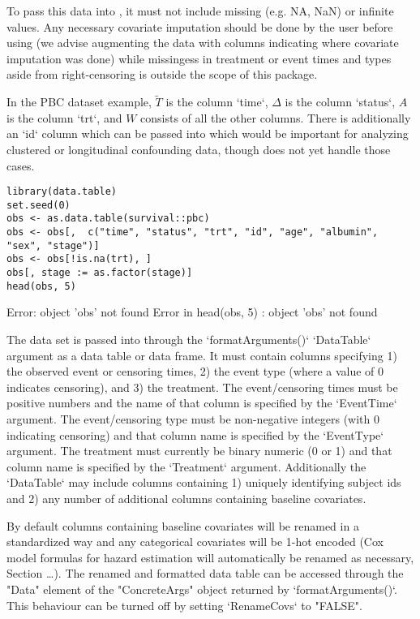 \documentclass{report}
\newcommand{\1}{\ensuremath{\mathbf{1}}}
\newcommand{\T}{\ensuremath{\widetilde{T}}}
\renewcommand{\L}{\ensuremath{W}}
\begin{document}
To pass this data into , it must not include missing (e.g. NA, NaN) or infinite values. Any necessary covariate imputation should be done by the user before using  (we advise augmenting the data with columns indicating where covariate imputation was done) while missingess in treatment or event times and types aside from right-censoring is outside the scope of this package.

In the PBC dataset example, \(\T\) is the column `time`, \(\Delta\) is the column `status`, \(A\) is the column `trt`, and \(\L\) consists of all the other columns. There is additionally an `id` column which can be passed into  which would be important for analyzing clustered or longitudinal confounding data, though  does not yet handle those cases. 

\begin{lstlisting}
library(data.table)
set.seed(0)
obs <- as.data.table(survival::pbc)
obs <- obs[,  c("time", "status", "trt", "id", "age", "albumin", "sex", "stage")]
obs <- obs[!is.na(trt), ]
obs[, stage := as.factor(stage)]
head(obs, 5)
\end{lstlisting}

Error: object 'obs' not found
Error in head(obs, 5) : object 'obs' not found

The data set is passed into  through the `formatArguments()` `DataTable` argument as a data table or data frame. It must contain columns specifying 1) the observed event or censoring times, 2) the event type (where a value of 0 indicates censoring), and 3) the treatment. The event/censoring times must be positive numbers and the name of that column is specified by the `EventTime` argument. The event/censoring type must be non-negative integers (with 0 indicating censoring) and that column name is specified by the `EventType` argument. The treatment must currently be binary numeric (0 or 1) and that column name is specified by the `Treatment` argument. Additionally the `DataTable` may include columns containing 1) uniquely identifying subject ids and 2) any number of additional columns containing baseline covariates.

By default columns containing baseline covariates will be renamed in a standardized way and any categorical covariates will be 1-hot encoded (Cox model formulas for hazard estimation will automatically be renamed as necessary, Section \ldots{}). The renamed and formatted data table can be accessed through the "Data" element of the "ConcreteArgs" object returned by `formatArguments()`. This behaviour can be turned off by setting `RenameCovs` to "FALSE".
\end{document}
